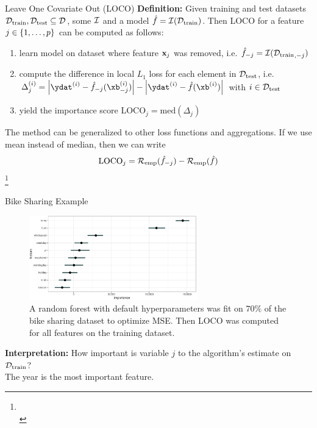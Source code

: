 \documentclass[11pt,compress,t,notes=noshow, xcolor=table]{beamer}
\begin{document}
\begin{vbframe}{Leave One Covariate Out (LOCO)}
%
\textbf{Definition:} Given training and test datasets $\Dtrain, \Dtest \subseteq \D$, some $\inducer$ and a model $\fh = \inducer(\Dtrain)$. Then LOCO for a feature $j \in \pset$ can be computed as follows:
  \begin{enumerate}
    \item learn model on dataset where feature $\xj$ was removed, i.e. $\fh_{-j} = \inducer({\Dtrain}_{,-j})$
    \item compute the difference in local $L_1$ loss for each element in $\Dtest$, i.e. $\Delta_j^{(i)} = \left  |\ydat^{(i)} - \fh_{-j}(\xb_{-j}^{(i)}) \right | - \left |\ydat^{(i)} - \fh(\xb^{(i)}) \right | $ with $i \in \Dtest$
    \item yield the importance score $\text{LOCO}_j = \text{med} \left ( \Delta_j  \right )$
  \end{enumerate}
\lz 
The method can be generalized to other loss functions and aggregations. If we use mean instead of median, then we can write
%
$$ \text{LOCO}_j = \riske(\fh_{-j}) - \riske(\fh) $$
\footnote[frame]{\\ }
\end{vbframe}

\begin{vbframe}{Bike Sharing Example}
%
\begin{figure}
  \centering
  \includegraphics[width=0.65\textwidth]{figure_man/bike_sharing_loco.pdf}
\caption{A random forest with default hyperparameters was fit on $70\%$ of the bike sharing dataset to optimize MSE. Then LOCO was computed for all features on the training dataset.}
\end{figure}
%
 \textbf{Interpretation:} How important is variable $j$ to the algorithm's estimate on $\Dtrain$?\\
The year is the most important feature.\\
%
\end{vbframe}
\end{document}
